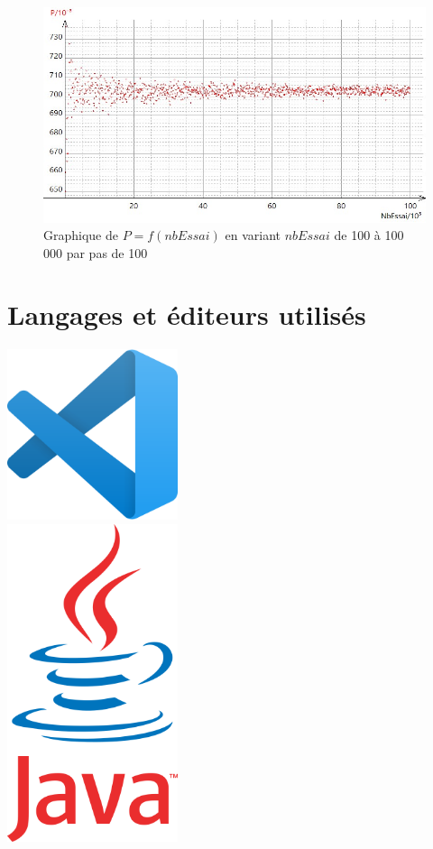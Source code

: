 \documentclass{report}
\begin{document}
\begin{figure}[H]
	\includegraphics[width=\textwidth]{../graphe/PE3C(n).jpg}
	\caption{Graphique de $P=f(nbEssai)$ en variant $nbEssai$ de 100 à 100 000 par pas de 100}
\end{figure}	























\appendix
\chapter{Langages et éditeurs utilisés}

\centering
  \includegraphics[width=5cm]{../graphe/Vscode.png}\\
  \bigskip
  \includegraphics[width=5cm]{../graphe/java.png}
\centering
\end{document}
